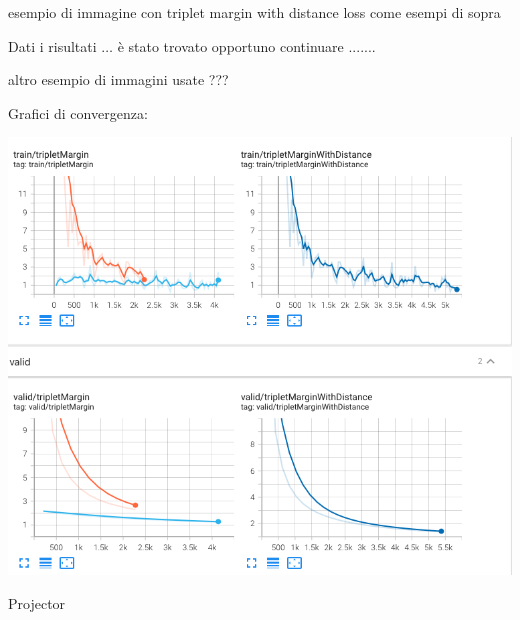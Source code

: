 \documentclass[11pt]{article}
\begin{document}
\begin{center}
    esempio di immagine con triplet margin with distance loss come esempi di sopra
\end{center}


Dati i risultati $\ldots$ è stato trovato opportuno continuare .......

\begin{center}
    altro esempio di immagini usate ???
\end{center}



Grafici di convergenza:

\begin{center}
    \begin{minipage}{0.48\linewidth}
    \includegraphics[width=\linewidth]{tensorboard_1.png}
    \end{minipage}
\end{center}

Projector
\end{document}
